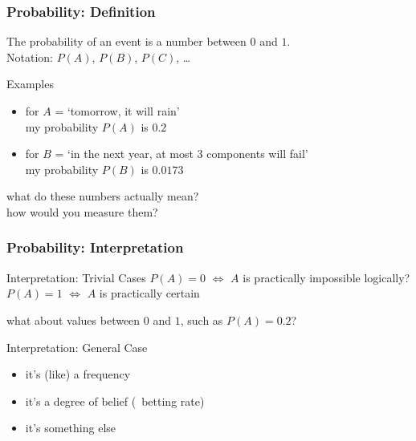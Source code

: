 \documentclass{beamer}
\newcommand{\play}{\structure{$\blacktriangleright$}}
\begin{document}
\begin{frame}
  \frametitle{Probability: Definition}
  \begin{definition}
    The \alert{probability of an event} is a number between $0$ and $1$.
    \\[1ex]
    Notation: $P(A)$, $P(B)$, $P(C)$, \dots
  \end{definition}
  \begin{exampleblock}{Examples}
    \begin{itemize}
    \item for $A$ = `tomorrow, it will rain' \\
      my probability $P(A)$ is $0.2$
    \item for $B$ = `in the next year, at most 3 components will fail' \\
      my probability $P(B)$ is $0.0173$
    \end{itemize}
  \end{exampleblock}
\pause
  \begin{alertblock}{}
    what do these numbers actually mean? \\
    how would you measure them?
  \end{alertblock}
\end{frame}

\begin{frame}
  \frametitle{Probability: Interpretation}
  \begin{block}{Interpretation: Trivial Cases}
    $P(A)=0$ $\iff$ $A$ is practically impossible {\hfill \scriptsize logically?}\\
    $P(A)=1$ $\iff$ $A$ is practically certain
  \end{block}
\pause
  \begin{alertblock}{}
    what about values between $0$ and $1$, such as $P(A)=0.2$?
  \end{alertblock}
\pause
  \begin{block}{Interpretation: General Case}
    \begin{itemize}
    \item it's (like) a \alert{frequency}
    \item it's a degree of belief (\play\ \alert{betting rate})
    \item it's something else
    \end{itemize}
  \end{block}
\end{frame}
\end{document}
